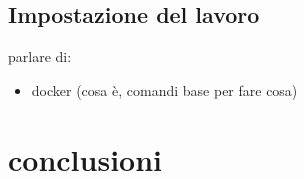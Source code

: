\documentclass[]{article}
\begin{document}
	\subsection{Impostazione del lavoro}
	parlare di:
	\begin{itemize}
		\item docker (cosa è, comandi base per fare cosa)
		
		
	\end{itemize}
		
	\section{conclusioni}
	
	
\end{document}
